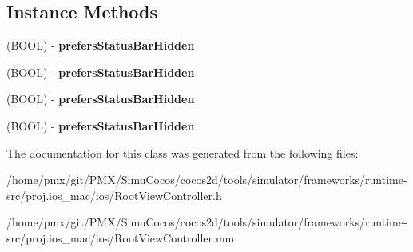 \subsection*{Instance Methods}
\begin{DoxyCompactItemize}
\item 
\mbox{\label{interfaceRootViewController_adbfb9d872d0f56fdf19a620d4b7a97c4}} 
(B\+O\+OL) -\/ {\bfseries prefers\+Status\+Bar\+Hidden}
\item 
\mbox{\label{interfaceRootViewController_adbfb9d872d0f56fdf19a620d4b7a97c4}} 
(B\+O\+OL) -\/ {\bfseries prefers\+Status\+Bar\+Hidden}
\item 
\mbox{\label{interfaceRootViewController_adbfb9d872d0f56fdf19a620d4b7a97c4}} 
(B\+O\+OL) -\/ {\bfseries prefers\+Status\+Bar\+Hidden}
\item 
\mbox{\label{interfaceRootViewController_adbfb9d872d0f56fdf19a620d4b7a97c4}} 
(B\+O\+OL) -\/ {\bfseries prefers\+Status\+Bar\+Hidden}
\end{DoxyCompactItemize}


The documentation for this class was generated from the following files\+:\begin{DoxyCompactItemize}
\item 
/home/pmx/git/\+P\+M\+X/\+Simu\+Cocos/cocos2d/tools/simulator/frameworks/runtime-\/src/proj.\+ios\+\_\+mac/ios/Root\+View\+Controller.\+h\item 
/home/pmx/git/\+P\+M\+X/\+Simu\+Cocos/cocos2d/tools/simulator/frameworks/runtime-\/src/proj.\+ios\+\_\+mac/ios/Root\+View\+Controller.\+mm\end{DoxyCompactItemize}
